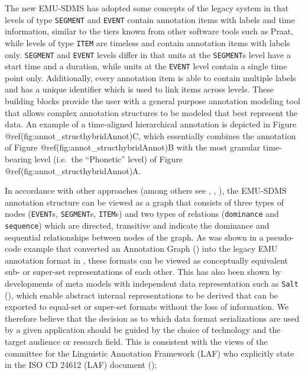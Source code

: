\documentclass[]{book}
\theoremstyle{definition}
\theoremstyle{definition}
\theoremstyle{definition}
\theoremstyle{remark}
\begin{document}
The new EMU-SDMS has adopted some concepts of the legacy system in that
levels of type \texttt{SEGMENT} and \texttt{EVENT} contain annotation
items with labels and time information, similar to the tiers known from
other software tools such as Praat, while levels of type \texttt{ITEM}
are timeless and contain annotation items with labels only.
\texttt{SEGMENT} and \texttt{EVENT} levels differ in that units at the
\texttt{SEGMENT}s level have a start time and a duration, while units at
the \texttt{EVENT} level contain a single time point only. Additionally,
every annotation item is able to contain multiple labels and has a
unique identifier which is used to link items across levels. These
building blocks provide the user with a general purpose annotation
modeling tool that allows complex annotation structures to be modeled
that best represent the data. An example of a time-aligned hierarchical
annotation is depicted in Figure @ref(fig:annot\_structhybridAnnot)C,
which essentially combines the annotation of Figure
@ref(fig:annot\_structhybridAnnot)B with the most granular time-bearing
level (i.e.~the ``Phonetic'' level) of Figure
@ref(fig:annot\_structhybridAnnot)A.

In accordance with other approaches (among others see
\citet{bird:sc2001a}, \citet{zipser:2010a}, \citet{ide:nle2004a}), the
EMU-SDMS annotation structure can be viewed as a graph that consists of
three types of nodes (\texttt{EVENT}s, \texttt{SEGMENT}s,
\texttt{ITEM}s) and two types of relations (\texttt{dominance} and
\texttt{sequence}) which are directed, transitive and indicate the
dominance and sequential relationships between nodes of the graph. As
was shown in a pseudo-code example that converted an Annotation Graph
(\citet{bird:sc2001a}) into the legacy EMU annotation format in
\citet{cassidy:sc2001a}, these formats can be viewed as conceptually
equivalent sub- or super-set representations of each other. This has
also been shown by developments of meta models with independent data
representation such as \texttt{Salt} (\citet{zipser:2010a}), which
enable abstract internal representations to be derived that can be
exported to equal-set or super-set formats without the loss of
information. We therefore believe that the decision as to which data
format serializations are used by a given application should be guided
by the choice of technology and the target audience or research field.
This is consistent with the views of the committee for the Linguistic
Annotation Framework (LAF) who explicitly state in the ISO CD 24612
(LAF) document (\citet{ISOLAF});
\end{document}
